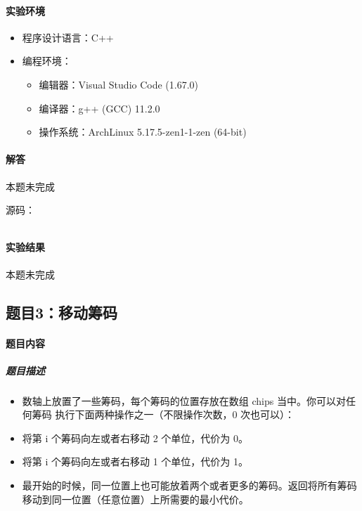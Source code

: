 \documentclass[12pt,a4paper]{ctexart}
\begin{document}
\vspace{5pt}

\paragraph{实验环境}
\begin{itemize}
    \item 程序设计语言：C++
    \item 编程环境：
    \begin{itemize}
        \item 编辑器：Visual Studio Code (1.67.0)
        \item 编译器：g++ (GCC) 11.2.0
        \item 操作系统：ArchLinux 5.17.5-zen1-1-zen (64-bit)
    \end{itemize}
\end{itemize}

\vspace{5pt}

\paragraph{解答} 本题未完成

源码：
\inputminted[bgcolor=codebg,frame=lines,autogobble,linenos=true,breaklines]{cpp}{src/t2.cpp}

\vspace{5pt}

\paragraph{实验结果}
本题未完成

\newpage

\subsection*{题目3：移动筹码}
\paragraph{题目内容}
\subparagraph{题目描述}

\begin{itemize}
    \item 数轴上放置了一些筹码，每个筹码的位置存放在数组 chips 当中。你可以对任何筹码 执行下面两种操作之一（不限操作次数，0 次也可以）：
    \item 将第 i 个筹码向左或者右移动 2 个单位，代价为 0。
    \item 将第 i 个筹码向左或者右移动 1 个单位，代价为 1。
    \item 最开始的时候，同一位置上也可能放着两个或者更多的筹码。返回将所有筹码移动到同一位置（任意位置）上所需要的最小代价。

\end{itemize}
\end{document}
